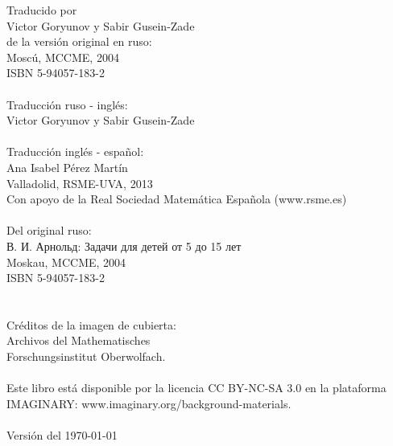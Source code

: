 \documentclass[12pt]{article}  %
\begin{document}
{%
\noindent
Traducido por \\
Victor Goryunov y Sabir Gusein-Zade \\
de la versi\'on original en ruso: \\
Mosc\'u, MCCME, 2004 \\
ISBN 5-94057-183-2\\
\\
Traducci\'on ruso - ingl\'es:\\
Victor Goryunov y Sabir Gusein-Zade\\
\\
Traducci\'on ingl\'es - espa\~{n}ol:\\
Ana Isabel P\'erez Mart\'in\\
Valladolid, RSME-UVA, 2013\\
Con apoyo de la Real Sociedad Matem\'atica Espa\~{n}ola (www.rsme.es)\\
\\
Del original ruso:\\
\textrussian{В. И. Арнольд: Задачи для детей от 5 до 15 лет}\\
Moskau, MCCME, 2004\\
ISBN 5-94057-183-2\\
\\
\\
Cr\'editos de la imagen de cubierta:\\
Archivos del 
Mathematisches \\Forschungsinstitut Oberwolfach.\\
\\
Este libro est\'a disponible por la licencia CC BY-NC-SA 3.0 en la plataforma IMAGINARY: www.imaginary.org/background-materials.\\
\\
Versión del \today
}
\end{document}
